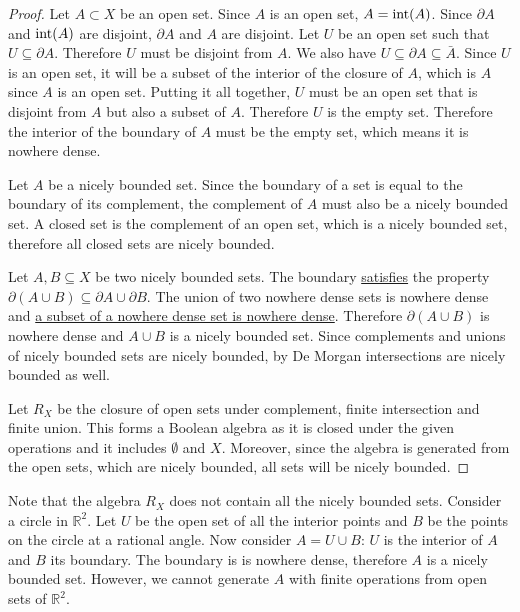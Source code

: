 \begin{mathSection}
\begin{proof}
	Let $A \subset X$ be an open set. Since $A$ is an open set, $A = \operatorname{int}(A)$. Since $\partial A$ and $\operatorname{int}(A)$ are disjoint, $\partial A$ and $A$ are disjoint. Let $U$ be an open set such that $U \subseteq \partial A$. Therefore $U$ must be disjoint from $A$. We also have $U \subseteq \partial A \subseteq \bar{A}$. Since $U$ is an open set, it will be a subset of the interior of the closure of $A$, which is $A$ since $A$ is an open set. Putting it all together, $U$ must be an open set that is disjoint from $A$ but also a subset of $A$. Therefore $U$ is the empty set. Therefore the interior of the boundary of $A$ must be the empty set, which means it is nowhere dense.
	
	Let $A$ be a nicely bounded set. Since the boundary of a set is equal to the boundary of its complement, the complement of $A$ must also be a nicely bounded set. A closed set is the complement of an open set, which is a nicely bounded set, therefore all closed sets are nicely bounded.
	
	Let $A, B \subseteq X$ be two nicely bounded sets. The boundary \href{https://proofwiki.org/wiki/Boundary_of_Union_is_Subset_of_Union_of_Boundaries}{satisfies} the property $\partial (A \cup B) \subseteq \partial A \cup \partial B$. The union of two nowhere dense sets is nowhere dense and \href{https://proofwiki.org/wiki/Subset_of_Nowhere_Dense_Subset_is_Nowhere_Dense}{a subset of a nowhere dense set is nowhere dense}. Therefore $\partial (A \cup B)$ is nowhere dense and $A \cup B$ is a nicely bounded set. Since complements and unions of nicely bounded sets are nicely bounded, by De Morgan intersections are nicely bounded as well.
	
	Let $R_X$ be the closure of open sets under complement, finite intersection and finite union. This forms a Boolean algebra as it is closed under the given operations and it includes $\emptyset$ and $X$. Moreover, since the algebra is generated from the open sets, which are nicely bounded, all sets will be nicely bounded.
\end{proof}

\begin{remark}
	Note that the algebra $R_X$ does not contain all the nicely bounded sets. Consider a circle in $\mathbb{R}^2$. Let $U$ be the open set of all the interior points and $B$ be the points on the circle at a rational angle. Now consider $A = U \cup B$: $U$ is the interior of $A$ and $B$ its boundary. The boundary is is nowhere dense, therefore $A$ is a nicely bounded set. However, we cannot generate $A$ with finite operations from open sets of $\mathbb{R}^2$.
\end{remark}


\end{mathSection}
